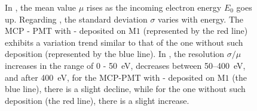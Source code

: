\begin{figure}[htbp]
\begin{subfigure}[b]{0.5\textwidth}
		\caption{}
		\label{fig:sigmamu}
	\end{subfigure}
	\caption{In , the mean value \(\mu\) rises as the incoming electron energy \(E_0\) goes up. Regarding , the standard deviation \(\sigma\) varies with energy. The MCP - PMT with - deposited on \(\mathrm{M}1\) (represented by the red line) exhibits a variation trend similar to that of the one without such deposition (represented by the blue line). In , the resolution \(\sigma/\mu\) increases in the range of 0 - \SI{50}{eV}, decreases between 50--\SI{400}{eV}, and after \SI{400}{eV}, for the MCP-PMT with - deposited on \(\mathrm{M}1\) (the blue line), there is a slight decline, while for the one without such deposition (the red line), there is a slight increase.
	}
	\label{fig:gaintest}
\end{figure}


